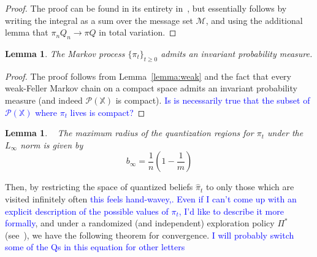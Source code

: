 \documentclass{article}
\newtheorem{lemma}[theorem]{Lemma}
\begin{document}
\begin{proof}
    The proof can be found in its entirety in~\cite{Linder}, but essentially follows by writing the integral as a sum over the message set \( \mathcal{M} \), and using the additional lemma that \( \pi_n Q_n \to \pi Q \) in total variation.
\end{proof}

\begin{lemma}\label{lemma:invariant}
    The Markov process \( \{\pi_t\}_{t\ge0} \) admits an invariant probability measure. %
\end{lemma}

\begin{proof}
    The proof follows from Lemma~\ref{lemma:weak} and the fact that every weak-Feller Markov chain on a compact space admits an invariant probability measure (and indeed \(\mathcal{P}(\mathbb{X})\) is compact). \textcolor{blue}{Is is necessarily true that the subset of \(\mathcal{P}(\mathbb{X})\) where \(\pi_t\) lives is compact?}
\end{proof}

\begin{lemma}\label{lemma:radius}~\cite[Proposition 2]{Reznik}
    The maximum radius of the quantization regions for \(\pi_t\) under the \( L_{\infty} \) norm is given by
    \[ b_{\infty} = \frac{1}{n}(1-\frac{1}{m}) \]
\end{lemma}

Then, by restricting the space of quantized beliefs \( \hat{\pi}_t \) to only those which are visited infinitely often \textcolor{blue}{this feels hand-wavey,. Even if I can't come up with an explicit description of the possible values of \(\pi_t\), I'd like to describe it more formally}, and under a randomized (and independent) exploration policy \( \Pi^* \) (see~\cite{Kara}), we have the following theorem for convergence. \textcolor{blue}{I will probably switch some of the Qs in this equation for other letters}
\end{document}
